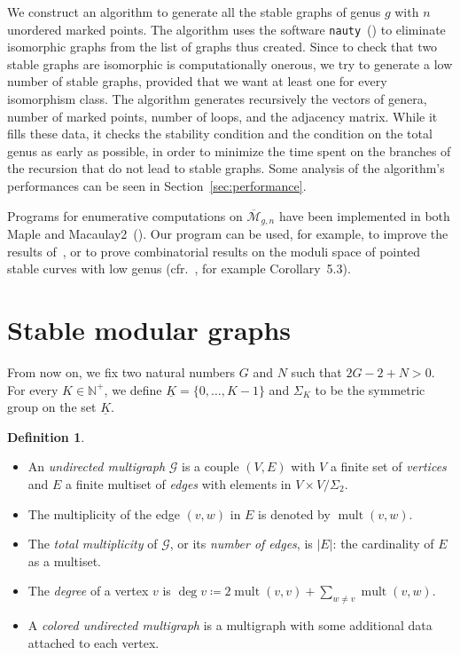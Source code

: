 \documentclass{amsart}
\theoremstyle{plain}
\theoremstyle{definition}
\newtheorem{definition}[theorem]{Definition}
\DeclareMathOperator{\mult}{mult}
\newcommand{\bN}{\mathbb{N}}
\newcommand{\graph}{\mathcal{G}}
\newcommand{\abs}[1]{\left|#1\right|}
\newcommand{\ubar}[1]{\underline{#1}}
\begin{document}
We construct an algorithm to generate all the stable graphs of genus
$g$ with $n$ unordered marked points. The algorithm uses the software
\texttt{nauty}~(\cite{nauty}) to eliminate isomorphic graphs from the
list of graphs thus created. Since to check that two stable graphs are
isomorphic is computationally onerous, we try to generate a low number
of stable graphs, provided that we want at least one for every
isomorphism class. The algorithm generates recursively the vectors of
genera, number of marked points, number of loops, and the adjacency
matrix. While it fills these data, it checks the stability condition
and the condition on the total genus as early as possible, in order to
minimize the time spent on the branches of the recursion that do not
lead to stable graphs. Some analysis of the algorithm's performances
can be seen in Section~\ref{sec:performance}.

Programs for enumerative computations on
$\overline{\mathcal{M}}_{g,n}$ have been implemented in both Maple and
Macaulay2~(\cite{faber,stephanie1,smith}). Our program can be used,
for example, to improve the results of~\cite[Section 5]{stephanie2},
or to prove combinatorial results on the moduli space of pointed
stable curves with low genus (cfr.~\cite{busonero}, for example
Corollary~5.3).



\section{Stable modular graphs}

From now on, we fix two natural numbers $G$ and $N$ such that $2
G-2+N>0$.  For every $K \in \bN^+$, we define $\ubar{K} = \{0, \dots,
K-1\}$ and $\Sigma_K$ to be the symmetric group on the set $\ubar{K}$.

\begin{definition}
  \mbox{}
  \begin{itemize}
  \item An \emph{undirected multigraph\/} $\graph$ is a couple $(V,
    E)$ with $V$ a finite set of \emph{vertices\/} and $E$ a finite
    multiset of \emph{edges\/} with elements in $V \times V/\Sigma_2$.
  \item The multiplicity of the edge $(v, w)$ in $E$ is denoted by
    $\mult(v, w)$.
  \item The \emph{total multiplicity\/} of $\graph$, or its
    \emph{number of edges}, is $\abs{E}$: the cardinality of $E$ as a
    multiset.
  \item The \emph{degree\/} of a vertex $v$ is $\deg v \coloneqq 2
    \mult(v, v) + \sum_{w \neq v} \mult(v, w)$.
  \item A \emph{colored undirected multigraph\/} is a multigraph with
    some additional data attached to each vertex.
  \end{itemize}
\end{definition}
\end{document}
